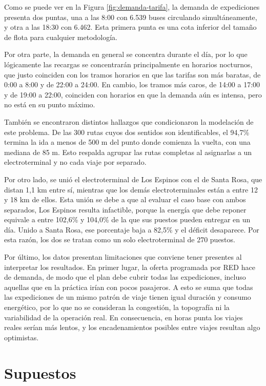 Como se puede ver en la Figura \ref{fig:demanda-tarifa}, la demanda de expediciones presenta dos puntas, una a las 8:00 con 6.539 buses circulando simultáneamente, y otra a las 18:30 con 6.462. Esta primera punta es una cota inferior del tamaño de flota para cualquier metodología.

Por otra parte, la demanda en general se concentra durante el día, por lo que lógicamente las recargas se concentrarán principalmente en horarios nocturnos, que justo coinciden con los tramos horarios en que las tarifas son más baratas, de 0:00 a 8:00 y de 22:00 a 24:00. En cambio, los tramos más caros, de 14:00 a 17:00 y de 19:00 a 22:00, coinciden con horarios en que la demanda aún es intensa, pero no está en su punto máximo.

También se encontraron distintos hallazgos que condicionaron la modelación de este problema. De las 300 rutas cuyos dos sentidos son identificables, el 94,7\% termina la ida a menos de 500 m del punto donde comienza la vuelta, con una mediana de 85 m. Esto respalda agrupar las rutas completas al asignarlas a un electroterminal y no cada viaje por separado.

Por otro lado, se unió el electroterminal de Los Espinos con el de Santa Rosa, que distan 1,1 km entre sí, mientras que los demás electroterminales están a entre 12 y 18 km de ellos. Esta unión se debe a que al evaluar el caso base con ambos separados, Los Espinos resulta infactible, porque la energía que debe reponer equivale a entre 102,6\% y 104,0\% de la que sus puestos pueden entregar en un día. Unido a Santa Rosa, ese porcentaje baja a 82,5\% y el déficit desaparece. Por esta razón, los dos se tratan como un solo electroterminal de 270 puestos.

Por último, los datos presentan limitaciones que conviene tener presentes al interpretar los resultados. En primer lugar, la oferta programada por RED hace de demanda, de modo que el plan debe cubrir todas las expediciones, incluso aquellas que en la práctica irían con pocos pasajeros. A esto se suma que todas las expediciones de un mismo patrón de viaje tienen igual duración y consumo energético, por lo que no se consideran la congestión, la topografía ni la variabilidad de la operación real. En consecuencia, en horas punta los viajes reales serían más lentos, y los encadenamientos posibles entre viajes resultan algo optimistas.

\section{Supuestos}
\label{sec:supuestos-informe2}

